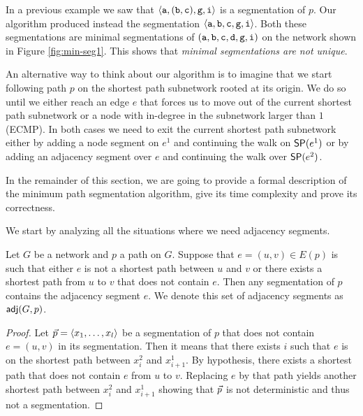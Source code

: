 \begin{observation*}
In a previous example we saw that $\langle \node{a}, (\node{b}, \node{c}), \node{g}, \node{i} \rangle$ is a segmentation of $p$. Our algorithm
produced instead the segmentation $\langle \node{a}, \node{b}, \node{c}, \node{g}, \node{i} \rangle$. Both these segmentations are minimal segmentations of 
$(\node{a}, \node{b}, \node{c}, \node{d}, \node{g}, \node{i})$ on the network shown in Figure \ref{fig:min-seg1}. This shows that \emph{minimal segmentations are not unique}.
\end{observation*}

An alternative way to think about our algorithm is to imagine that we start following path $p$ on the shortest path subnetwork rooted at its origin.
We do so until we either reach an edge $e$ that forces us to move out of the current shortest path subnetwork or a node with in-degree in the subnetwork
larger than $1$ (ECMP). In both cases we need to exit the current shortest path subnetwork either by adding a node segment on $e^1$ and continuing the walk
on $\sp(e^1)$ or by adding an adjacency segment over $e$ and continuing the walk over $\sp(e^2)$.

In the remainder of this section, we are going to provide a formal description of the minimum path segmentation
algorithm, give its time complexity and prove its correctness.

We start by analyzing all the situations where we need adjacency segments.

\begin{proposition}
\label{prop:adj-segs}
Let $G$ be a network and $p$ a path on $G$. Suppose that $e = (u, v) \in E(p)$ is such that either $e$ is not a shortest path
between $u$ and $v$ or there exists a shortest path from $u$ to $v$ that does not contain $e$. Then any segmentation of $p$ contains the
adjacency segment $e$. We denote this set of adjacency segments as $\adj(G, p)$.
\end{proposition}

\begin{proof}
Let $\sr{p} = \langle x_1, \ldots, x_l \rangle$ be a segmentation of $p$ that does not contain $e = (u, v)$ in its segmentation.
Then it means that there exists $i$ such that $e$ is on the shortest path between $x^2_i$ and $x^1_{i + 1}$. By hypothesis,
there exists a shortest path that does not contain $e$ from $u$ to $v$. Replacing $e$ by that path yields another shortest path
between $x^2_i$ and $x^1_{i + 1}$ showing that $\sr{p}$ is not deterministic and thus not a segmentation.
\end{proof}

